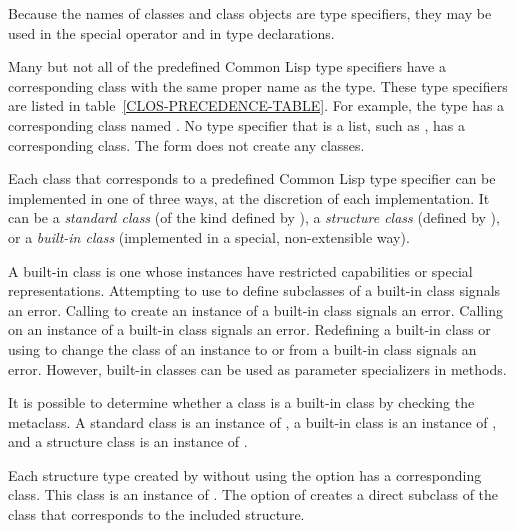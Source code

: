 Because the names of classes and class objects are type specifiers, they may
be used in the special operator  and in type declarations.

Many but not all of the predefined Common Lisp type specifiers have a
corresponding class with the same proper name as the type.  These type
specifiers are listed in table~\ref{CLOS-PRECEDENCE-TABLE}.  For example, the
type  has a corresponding class named .  No type specifier
that is a list, such as , has a corresponding
class. The form  does not create any classes.

Each class that corresponds to a predefined Common Lisp type specifier
can be implemented in one of three ways, at the discretion of each
implementation.  It can be a \emph{standard class\/} (of the kind
defined by ), a \emph{structure class\/} (defined
by ), or a \emph{built-in class\/} (implemented in
a special, non-extensible way).

A built-in class is one whose instances have restricted capabilities or
special representations.  Attempting to use  to define 
subclasses of a built-in class signals an error.  Calling 
 to create an instance of a built-in class signals an error.
Calling  on an instance of a built-in class signals an
error.  Redefining a built-in class or using  to change
the class of an instance to or from a built-in class signals an error.
However, built-in classes can be used as parameter specializers in
methods.


It is possible to determine whether a class is a built-in class by
checking the metaclass.  A standard class is an instance of 
, a built-in class is an instance of 
, and a structure class is an instance of 
.

Each structure type created by  without using the 
 option has a corresponding class.  This class is an instance of
.  
The  option of  creates a direct
subclass of the class that corresponds to the included structure.

